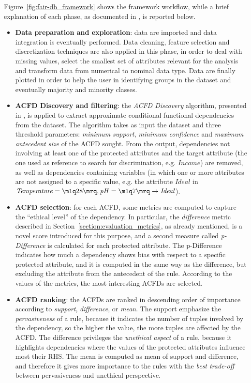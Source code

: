 Figure~\ref{fig:fair-db_framework} shows the framework workflow, while a brief explanation of each phase, as documented in \cite{azzalini2021fair}, is reported below.
\begin{itemize}
\item \textbf{Data preparation and exploration}: data are imported and data integration is eventually performed. Data cleaning, feature selection and discretization techniques are also applied in this phase, in order to deal with missing values, select the smallest set of attributes relevant for the analysis and transform data from numerical to nominal data type. Data are finally plotted in order to help the user in identifying groups in the dataset and eventually majority and minority classes.
\item \textbf{ACFD Discovery and filtering}: the \textit{ACFD Discovery} algorithm, presented in \cite{rammelaere2018revisiting}, is applied to extract approximate conditional functional dependencies from the dataset. The algorithm takes as input the dataset and three threshold parameters: \textit{minimum support}, \textit{minimum confidence} and \textit{maximum antecedent size} of the ACFD sought. From the output, dependencies not involving at least one of the protected attributes and the target attribute (the one used as reference to search for discrimination, e.g. \(\mathit{Income}\)) are removed, as well as dependencies containing variables (in which one or more attributes are not assigned to a specific value, e.g. the attribute \(\mathit{Ideal}\) in \(\mathit{Temperature} = \mlq 28 \mrq, \mathit{pH} = \mlq 7 \mrq \rightarrow \mathit{Ideal}\)).
\item \textbf{ACFD selection}: for each ACFD, some metrics are computed to capture the ``ethical level'' of the dependency. In particular, the \textit{difference} metric described in Section~\ref{section:evaluation_metrics}, as already mentioned, is a novel score introduced for this purpose, and a second measure called \textit{p-Difference} is calculated for each protected attribute. The p-Difference indicates how much a dependency shows bias with respect to a specific protected attribute, and it is computed in the same way as the difference, but excluding the attribute from the antecedent of the rule. According to the values of the metrics, the most interesting ACFDs are selected.
\item \textbf{ACFD ranking}: the ACFDs are ranked in descending order of importance according to \textit{support}, \textit{difference}, or \textit{mean}. The support emphasize the \textit{pervasiveness} of a rule, because it indicates the number of tuples involved by the dependency, so the higher the value, the more tuples are affected by the ACFD. The difference privileges the \textit{unethical aspect} of a rule, because it highlights dependencies where the values of the protected attributes influence most their RHS. The mean is computed as mean of support and difference, and therefore it gives more importance to the rules with the \textit{best trade-off} between pervasiveness and unethical perspective.

\end{itemize}

